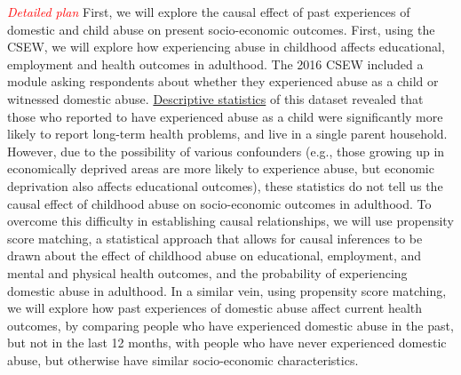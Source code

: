 \documentclass[11pt, a4paper]{article}
\begin{document}
%
%


\textcolor{red}{\textit{Detailed plan}} First, we will explore the causal effect of past experiences of domestic and child abuse on present socio-economic outcomes. First, using the CSEW, we will explore how experiencing abuse in childhood affects educational, employment and health outcomes in adulthood. The 2016 CSEW included a module asking respondents about whether they experienced abuse as a child or witnessed domestic abuse. \href{https://www.ons.gov.uk/releases/abuseduringchildhoodfindingsfromtheyearendingmarch2016crimesurveyforenglandandwales}{Descriptive statistics} of this dataset revealed that those who reported to have experienced abuse as a child were significantly more likely to report long-term health problems, and live in a single parent household. However, due to the possibility of various confounders (e.g., those growing up in economically deprived areas are more likely to experience abuse, but economic deprivation also affects educational outcomes), these statistics do not tell us the causal effect of childhood abuse on socio-economic outcomes in adulthood. To overcome this difficulty in establishing causal relationships, we will use propensity score matching, a statistical approach that allows for causal inferences to be drawn about the effect of childhood abuse on educational, employment, and mental and physical health outcomes, and the probability of experiencing domestic abuse in adulthood. In a similar vein, using propensity score matching, we will explore how past experiences of domestic abuse affect current health outcomes, by comparing people who have experienced domestic abuse in the past, but not in the last 12 months, with people who have never experienced domestic abuse, but otherwise have similar socio-economic characteristics.
\end{document}
